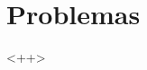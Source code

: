 \documentclass[../main.tex]{subfiles}
\begin{document}
\section{Problemas}%
\label{sec:problemas}


\thispagestyle{fancy}

<++>
\end{document}
